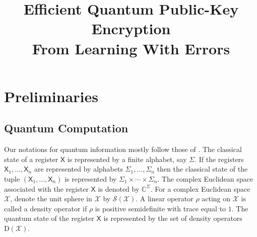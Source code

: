 \documentclass[11pt]{article}
\title{Efficient Quantum Public-Key Encryption \\ From Learning With Errors}
\author{
}
\date{}
\theoremstyle{plain}
\theoremstyle{definition}
\def\C{\mathbb{C}}
\def\X{\mathcal{X}}
\def\SX{\mathcal{S(X)}}
\begin{document}
\maketitle








\section{Preliminaries}
\label{sec:preli}



\subsection{Quantum Computation}

Our notations for quantum information mostly follow those of \cite{watrous2018theory}. The classical state of a register $\mathsf{X}$ is represented by a finite alphabet, say $\Sigma$. If the registers $\mathsf{X}_1, \dots, \mathsf{X}_n$ are represented by alphabets $\Sigma_1, \dots, \Sigma_n$ then the classical state of the tuple $(\mathsf{X}_1, \dots, \mathsf{X}_n)$ is represented by $\Sigma_1 \times \cdots \times \Sigma_n$. The complex Euclidean space associated with the register $\mathsf{X}$ is denoted by $\C^\Sigma$. For a complex Euclidean space $\X$, denote the unit sphere in $\X$ by $\SX$. A linear operator $\rho$ acting on $\X$ is called a density operator if $\rho$ is positive semidefinite with trace equal to $1$. The quantum state of the register $\mathsf{X}$ is represented by the set of density operators $\mathrm{D}(\X)$.
\end{document}
